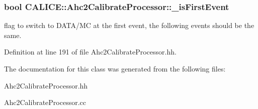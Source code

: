 \subsubsection[{\-\_\-is\-First\-Event}]{\setlength{\rightskip}{0pt plus 5cm}bool C\-A\-L\-I\-C\-E\-::\-Ahc2\-Calibrate\-Processor\-::\-\_\-is\-First\-Event\hspace{0.3cm}{\ttfamily [protected]}}\label{classCALICE_1_1Ahc2CalibrateProcessor_af4cd3d6df2a690c09a6eb2689505a4b4}


flag to switch to D\-A\-T\-A/\-M\-C at the first event, the following events should be the same. 



Definition at line 191 of file Ahc2\-Calibrate\-Processor.\-hh.



The documentation for this class was generated from the following files\-:\begin{DoxyCompactItemize}
\item 
Ahc2\-Calibrate\-Processor.\-hh\item 
Ahc2\-Calibrate\-Processor.\-cc\end{DoxyCompactItemize}
